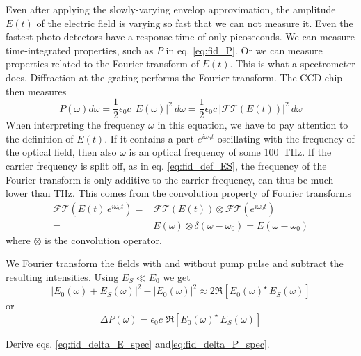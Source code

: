 Even after applying the slowly-varying envelop approximation, the amplitude $E(t)$ of the electric field is varying so fast that we can not measure it. Even the fastest photo detectors have a response time of only picoseconds. We can measure time-integrated properties, such as $P$ in eq. \ref{eq:fid_P}. Or we can measure properties related to the Fourier transform of  $E(t)$. This is what a spectrometer does. Diffraction at the grating performs the Fourier transform. The CCD chip then measures
\begin{equation}
 P (\omega) d\omega =  \frac{1}{2} \epsilon_0 c \,  \left| E(\omega) \right|^2 \ d\omega =  \frac{1}{2} \epsilon_0 c \,  \left|  \mathcal{FT} ( E(t) ) \right|^2 \ d\omega
\end{equation}
When interpreting the frequency $\omega$ in this equation, we have to pay attention to the definition of $E(t) $. If it contains a part $e^{i \omega_0 t}$ oscillating with the frequency of the optical field, then also $\omega$ is an optical frequency of some 100~THz. If the carrier frequency is split off, as in eq.  \ref{eq:fid_def_ES}, the frequency of the Fourier transform is only additive to the carrier frequency, can thus be much lower than THz. This comes from the convolution property of Fourier transforms
\begin{align}
 \mathcal{FT} \left( E(t) \, e^{i \omega_0 t} \right) 
  = &
  \mathcal{FT} \left( E(t)  \right)  \otimes
 \mathcal{FT} \left(  e^{i \omega_0 t} \right)  \\
 = &
  E(\omega) \otimes
\delta (\omega - \omega_0 ) =  
E (\omega - \omega_0 )
\end{align}
where $\otimes$ is the convolution operator. 

We  Fourier transform the fields with and without pump pulse 
and subtract the resulting intensities. Using $E_S \ll E_0$ we get
\begin{equation}
 \left| E_0(\omega) + E_S(\omega) \right|^2 -  \left| E_0(\omega)  \right|^2 \approx 2  \Re \left[ E_0(\omega)^\star   \, E_S(\omega)  \right] \label{eq:fid_delta_E_spec}
\end{equation}
or
\begin{equation}
\Delta P (\omega) =  \epsilon_0 c \, \, \Re \left[  E_0(\omega)^\star   \, E_S(\omega)  \right] \label{eq:fid_delta_P_spec}
\end{equation}


\begin{questions}

\item Derive  eqs. \ref{eq:fid_delta_E_spec} and\ref{eq:fid_delta_P_spec}.%

\end{questions}
 

